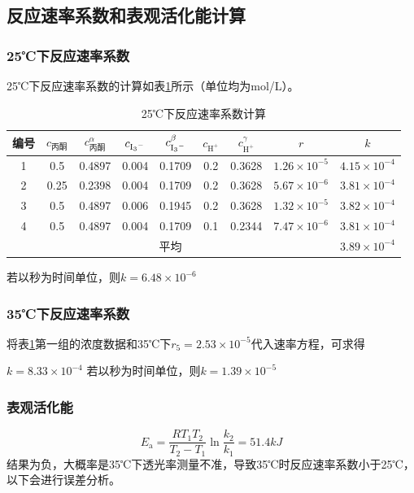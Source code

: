 \documentclass[hyperref,a4paper,UTF8]{ctexart}
\begin{document}
\subsection{反应速率系数和表观活化能计算}
\subsubsection{25℃下反应速率系数}
    25℃下反应速率系数的计算如表\ref{tab:k1_cal}所示（单位均为mol/L）。
\begin{table}[H]
\centering
\caption{25℃下反应速率系数计算}
\label{tab:k1_cal}
\begin{tabularx}{0.85\textwidth}{ccccccccc}
\toprule
编号 & $c_{\text{丙酮}}$ & $c_{\text{丙酮}}^\alpha$ & $c_{\ce{I3^-}}$ & $c_{\ce{I3^-}}^\beta$ & $c_{\mathrm{H}^{+}}$ & $c_{\mathrm{H}^{+}}^\gamma$ & $r$ & $k$ \\
\midrule
1 & 0.5 & 0.4897 & 0.004 & 0.1709 & 0.2 & 0.3628 & $1.26\times 10^{-5}$ & $4.15\times 10^{-4}$ \\
2 & 0.25 & 0.2398 & 0.004 & 0.1709 & 0.2 & 0.3628 & $5.67\times 10^{-6}$ & $3.81\times 10^{-4}$ \\
3 & 0.5 & 0.4897 & 0.006 & 0.1945 & 0.2 & 0.3628 & $1.32\times 10^{-5}$ & $3.82\times 10^{-4}$ \\
4 & 0.5 & 0.4897 & 0.004 & 0.1709 & 0.1 & 0.2344 & $7.47\times 10^{-6}$ & $3.81\times 10^{-4}$ \\
\midrule
\multicolumn{8}{c}{平均} & $3.89\times 10^{-4}$ \\
\bottomrule
\end{tabularx}
\end{table}
若以秒为时间单位，则$k=6.48\times 10^{-6}$
\subsubsection{35℃下反应速率系数}
    
将表\ref{tab:k1_cal}第一组的浓度数据和35℃下$r_5=2.53 \times 10^{-5}$代入速率方程，可求得

$
k=8.33 \times 10^{-4}
$
若以秒为时间单位，则$k=1.39\times 10^{-5}$
\subsubsection{表观活化能}    
\begin{equation}
E_{\mathrm{a}}=\frac{R T_1 T_2}{T_2-T_1} \ln \frac{k_2}{k_1}=51.4kJ
\end{equation}
结果为负，大概率是35℃下透光率测量不准，导致35℃时反应速率系数小于25℃，以下会进行误差分析。
\end{document}
